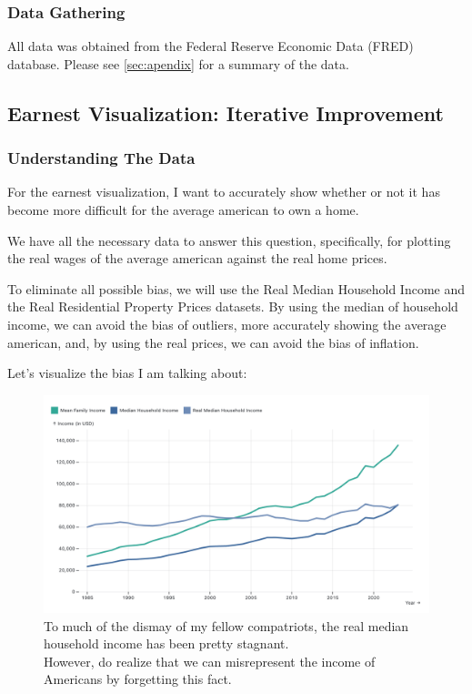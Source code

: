 \documentclass{article}
\begin{document}
\subsubsection{Data Gathering}

All data was obtained from the Federal Reserve Economic Data (FRED) database. 
Please see \autoref{sec:apendix} for a summary of the data.

\subsection{Earnest Visualization: Iterative Improvement}
\subsubsection{Understanding The Data}

For the earnest visualization, I want to accurately show whether or not it has become
more difficult for the average american to own a home. 

We have all the necessary data to answer this question, specifically, for plotting the
real wages of the average american against the real home prices.

To eliminate all possible bias, we will use the Real Median Household Income 
and the Real Residential Property Prices datasets. By using the median of household income,
we can avoid the bias of outliers, more accurately showing the average american, 
and, by using the real prices, we can avoid the bias of inflation. 

Let's visualize the bias I am talking about:

\begin{figure}[ht] 
  \centering
  \includegraphics[width=.90\textwidth]{figs/income.png}
  \caption{
      To much of the dismay of my fellow compatriots, the real median household income has been pretty stagnant. \\
      However, do realize that we can misrepresent the income of Americans by forgetting this fact.
  }
  \label{fig:income}
\end{figure}
\end{document}
